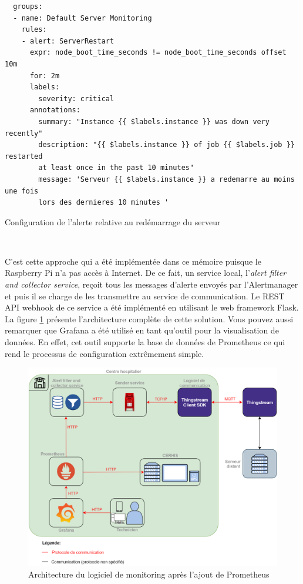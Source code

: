 \begin{listing}

  \begin{verbatim}
  groups:
  - name: Default Server Monitoring
    rules:
    - alert: ServerRestart
      expr: node_boot_time_seconds != node_boot_time_seconds offset 10m
      for: 2m
      labels:
        severity: critical
      annotations:
        summary: "Instance {{ $labels.instance }} was down very recently"
        description: "{{ $labels.instance }} of job {{ $labels.job }} restarted
        at least once in the past 10 minutes"
        message: 'Serveur {{ $labels.instance }} a redemarre au moins une fois
        lors des dernieres 10 minutes '
  \end{verbatim}

\caption{Configuration de l'alerte relative au redémarrage du serveur}
\label{lst:alert}

\end{listing}

~

\noindent
C’est cette approche qui a été implémentée dans ce mémoire puisque le Raspberry Pi n’a pas accès à Internet. De ce fait, un service local, l’\textit{alert filter and collector service}, reçoit tous les messages d’alerte envoyés par l’Alertmanager et puis il se charge de les transmettre au service de communication. Le REST API webhook de ce service a été implémenté en utilisant le web framework Flask. La figure \ref{fig:archprometheus} présente l’architecture complète de cette solution. Vous pouvez aussi remarquer que Grafana a été utilisé en tant qu’outil pour la visualisation de données. En effet, cet outil supporte la base de données de Prometheus ce qui rend le processus de configuration extrêmement simple.

\begin{figure}
  \includegraphics[width=\textwidth]{img/app/arch_with_prom.png}
  \caption{Architecture du logiciel de monitoring après l'ajout de Prometheus}
  \label{fig:archprometheus}
\end{figure}

